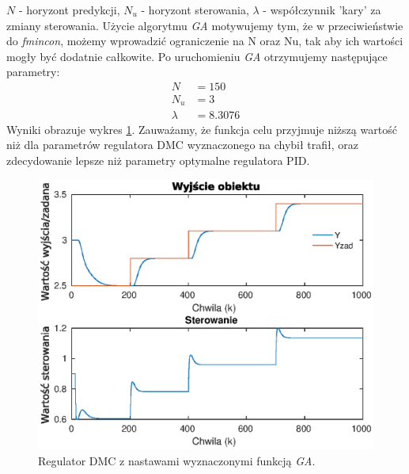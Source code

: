 $N$ - horyzont predykcji,
$N_u$ - horyzont sterowania,
$\lambda$ - współczynnik 'kary' za zmiany sterowania.
Użycie algorytmu \emph{GA} motywujemy tym, że w przeciwieństwie do \emph{fmincon}, możemy wprowadzić ograniczenie na N oraz Nu, tak aby ich wartości mogły być dodatnie całkowite.
Po uruchomieniu \emph{GA} otrzymujemy następujące parametry:
\begin{align}
  N &= 150 \nonumber \\
  N_u &= 3 \\
  \lambda &= 8.3076 \nonumber
\end{align}
Wyniki obrazuje wykres \ref{fig:optim_dmc}.
Zauważamy, że funkcja celu przyjmuje niższą wartość niż dla parametrów regulatora DMC wyznaczonego na chybił trafił, oraz zdecydowanie lepsze niż parametry optymalne regulatora PID.
\begin{figure}
  \includegraphics{wykresy/optim_dmc.eps}
  \caption{Regulator DMC z nastawami wyznaczonymi funkcją \emph{GA}.}
  \label{fig:optim_dmc}
\end{figure}
